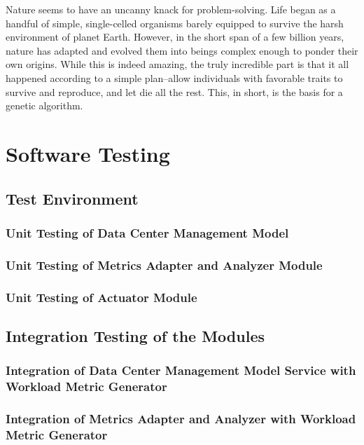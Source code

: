 \documentclass[12pt]{report}
\begin{document}
Nature seems to have an uncanny knack for problem-solving. Life began as a handful of simple, single-celled organisms barely equipped to survive the harsh environment of planet Earth. However, in the short span of a few billion years, nature has adapted and evolved them into beings complex enough to ponder their own origins. While this is indeed amazing, the truly incredible part is that it all happened according to a simple plan--allow individuals with favorable traits to survive and reproduce, and let die all the rest. This, in short, is the basis for a genetic algorithm. 





\pagestyle{fancy}
\chead{}
\rfoot{\small{\thepage}}
\renewcommand{\headrulewidth}{0.4pt}
\renewcommand{\footrulewidth}{0.4pt}
\chapter{Software Testing}
\section{Test Environment}
\subsection{Unit Testing of Data Center Management Model}
\subsection{Unit Testing of Metrics Adapter and Analyzer Module}
\subsection{Unit Testing of Actuator Module}

\section{Integration Testing of the Modules}
\subsection{Integration of Data Center Management Model Service with Workload Metric Generator}
\subsection{Integration of Metrics Adapter and Analyzer with Workload Metric Generator}
\end{document}

